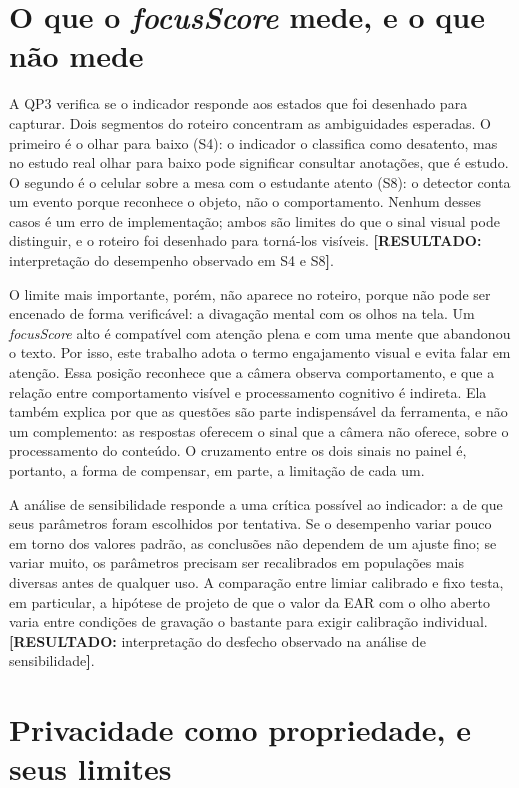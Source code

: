 \documentclass[portuguese,oneside]{tcc}
\newcommand{\fs}{\emph{focusScore}\xspace}
\newcommand{\resultado}[1]{\textcolor{red!70!black}{\textbf{[RESULTADO:} #1\textbf{]}}}
\begin{document}
\section{O que o \fs mede, e o que não mede}

A QP3 verifica se o indicador responde aos estados que foi desenhado para capturar. Dois segmentos do roteiro concentram as ambiguidades esperadas. O primeiro é o olhar para baixo (S4): o indicador o classifica como desatento, mas no estudo real olhar para baixo pode significar consultar anotações, que é estudo. O segundo é o celular sobre a mesa com o estudante atento (S8): o detector conta um evento porque reconhece o objeto, não o comportamento. Nenhum desses casos é um erro de implementação; ambos são limites do que o sinal visual pode distinguir, e o roteiro foi desenhado para torná-los visíveis. \resultado{interpretação do desempenho observado em S4 e S8}.

O limite mais importante, porém, não aparece no roteiro, porque não pode ser encenado de forma verificável: a divagação mental com os olhos na tela. Um \fs alto é compatível com atenção plena e com uma mente que abandonou o texto. Por isso, este trabalho adota o termo engajamento visual e evita falar em atenção. Essa posição reconhece que a câmera observa comportamento, e que a relação entre comportamento visível e processamento cognitivo é indireta. Ela também explica por que as questões são parte indispensável da ferramenta, e não um complemento: as respostas oferecem o sinal que a câmera não oferece, sobre o processamento do conteúdo. O cruzamento entre os dois sinais no painel é, portanto, a forma de compensar, em parte, a limitação de cada um.

A análise de sensibilidade responde a uma crítica possível ao indicador: a de que seus parâmetros foram escolhidos por tentativa. Se o desempenho variar pouco em torno dos valores padrão, as conclusões não dependem de um ajuste fino; se variar muito, os parâmetros precisam ser recalibrados em populações mais diversas antes de qualquer uso. A comparação entre limiar calibrado e fixo testa, em particular, a hipótese de projeto de que o valor da EAR com o olho aberto varia entre condições de gravação o bastante para exigir calibração individual. \resultado{interpretação do desfecho observado na análise de sensibilidade}.

\section{Privacidade como propriedade, e seus limites}
\end{document}
